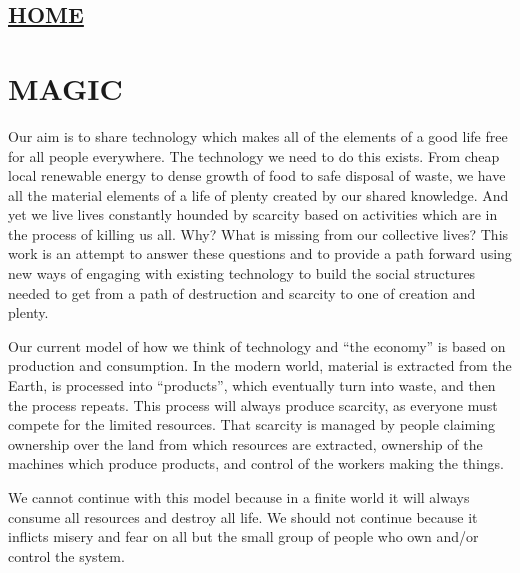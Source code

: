\hypertarget{home}{%
\subsection{\texorpdfstring{\href{scrolls/home}{HOME}}{HOME}}\label{home}}

\hypertarget{magic}{%
\section{MAGIC}\label{magic}}

Our aim is to share technology which makes all of the elements of a good
life free for all people everywhere. The technology we need to do this
exists. From cheap local renewable energy to dense growth of food to
safe disposal of waste, we have all the material elements of a life of
plenty created by our shared knowledge. And yet we live lives constantly
hounded by scarcity based on activities which are in the process of
killing us all. Why? What is missing from our collective lives? This
work is an attempt to answer these questions and to provide a path
forward using new ways of engaging with existing technology to build the
social structures needed to get from a path of destruction and scarcity
to one of creation and plenty.

Our current model of how we think of technology and ``the economy'' is
based on production and consumption. In the modern world, material is
extracted from the Earth, is processed into ``products'', which
eventually turn into waste, and then the process repeats. This process
will always produce scarcity, as everyone must compete for the limited
resources. That scarcity is managed by people claiming ownership over
the land from which resources are extracted, ownership of the machines
which produce products, and control of the workers making the things.

We cannot continue with this model because in a finite world it will
always consume all resources and destroy all life. We should not
continue because it inflicts misery and fear on all but the small group
of people who own and/or control the system.

